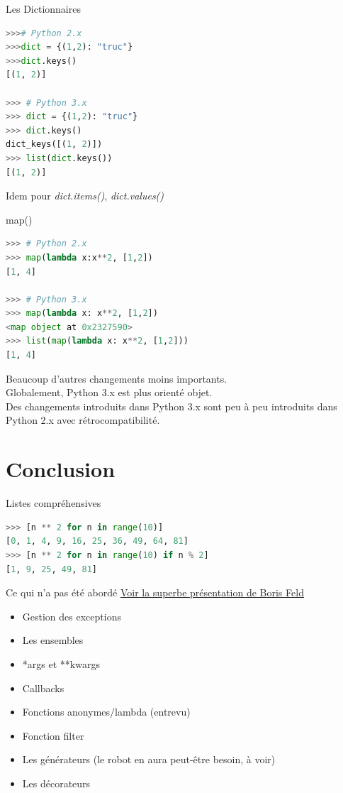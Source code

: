 \documentclass{beamer}
\begin{document}
\begin{frame}[fragile]{Les Dictionnaires}
\begin{lstlisting}[language=python, multicols=2]
>>># Python 2.x
>>>dict = {(1,2): "truc"}
>>>dict.keys()
[(1, 2)]

>>> # Python 3.x
>>> dict = {(1,2): "truc"}
>>> dict.keys()
dict_keys([(1, 2)])
>>> list(dict.keys())
[(1, 2)]
\end{lstlisting}

Idem pour \textit{dict.items()}, \textit{dict.values()}
\end{frame}

\begin{frame}[fragile]{map()}
\begin{lstlisting}[language=python]
>>> # Python 2.x
>>> map(lambda x:x**2, [1,2])
[1, 4]

>>> # Python 3.x
>>> map(lambda x: x**2, [1,2])
<map object at 0x2327590>
>>> list(map(lambda x: x**2, [1,2]))
[1, 4]
\end{lstlisting}
Beaucoup d'autres changements moins importants.\\
Globalement, Python 3.x est plus orienté objet.\\
Des changements introduits dans Python 3.x sont peu à peu introduits dans Python 2.x avec rétrocompatibilité.
\end{frame}

\section{Conclusion}

\begin{frame}[fragile]{Listes compréhensives}
\begin{lstlisting}[language=python]
>>> [n ** 2 for n in range(10)]
[0, 1, 4, 9, 16, 25, 36, 49, 64, 81]
>>> [n ** 2 for n in range(10) if n % 2]
[1, 9, 25, 49, 81]
\end{lstlisting}
\end{frame}

\begin{frame}{Ce qui n'a pas été abordé}
\href{http://feldboris.alwaysdata.net/blog/pages/presentations/pythonutbm}{Voir la superbe présentation de Boris Feld}
\begin{itemize}
 \item Gestion des exceptions
 \item Les ensembles
 \item *args et **kwargs
 \item Callbacks
 \item Fonctions anonymes/lambda (entrevu)
 \item Fonction filter
 \item Les générateurs (le robot en aura peut-être besoin, à voir)
 \item Les décorateurs
\end{itemize}
\end{frame}
\end{document}
